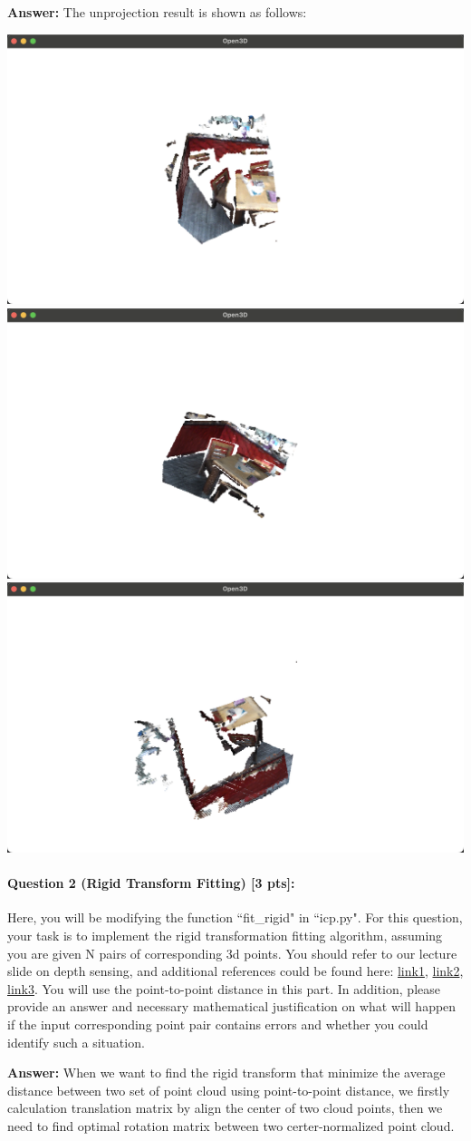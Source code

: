 \documentclass[11pt]{article}
\begin{document}
\textbf{Answer: } The unprojection result is shown as follows:
\begin{center}
    \small
    \includegraphics[width=0.3\linewidth]{fig/Q1output1.png}
    \includegraphics[width=0.3\linewidth]{fig/Q1output3.png}
    \includegraphics[width=0.3\linewidth]{fig/Q1output2.png}
\end{center}
\paragraph{Question 2 (Rigid Transform Fitting) [3 pts]:} Here, you will be modifying the function ``fit\_rigid" in ``icp.py". For this question, your task is to implement the rigid transformation fitting algorithm, assuming you are given N pairs of corresponding 3d points. You should refer to our lecture slide on depth sensing, and additional references could be found here: \href{https://www.ltu.se/cms_fs/1.51590!/svd-fitting.pdf}{link1}, \href{https://igl.ethz.ch/projects/ARAP/svd_rot.pdf}{link2}, \href{https://en.wikipedia.org/wiki/Orthogonal_Procrustes_problem}{link3}. You will use the point-to-point distance in this part. 
In addition, please provide an answer and necessary mathematical justification on what will happen if the input corresponding point pair contains errors and whether you could identify such a situation. 

\textbf{Answer: } When we want to find the rigid transform that minimize the average distance between two set of point cloud using point-to-point distance, we firstly calculation translation matrix by align the center of two cloud points, then we need to find optimal rotation matrix between two certer-normalized point cloud.
\end{document}
